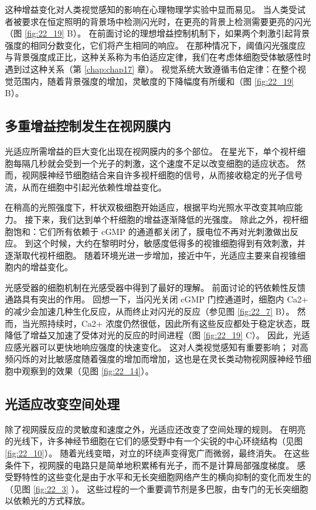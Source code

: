 这种增益变化对人类视觉感知的影响在心理物理学实验中显而易见。
当人类受试者被要求在恒定照明的背景场中检测闪光时，在更亮的背景上检测需要更亮的闪光（图 \ref{fig:22_19} B）。 
在前面讨论的理想增益控制机制下，如果两个刺激引起背景强度的相同分数变化，它们将产生相同的响应。 
在那种情况下，阈值闪光强度应与背景强度成正比，这种关系称为韦伯适应定律，我们在考虑体细胞受体敏感性时遇到过这种关系（第 \ref{chap:chap17} 章）。 
视觉系统大致遵循韦伯定律：在整个视觉范围内，随着背景强度的增加，灵敏度的下降幅度有所缓和（图 \ref{fig:22_19} B）。


\subsection{多重增益控制发生在视网膜内}
光适应所需增益的巨大变化出现在视网膜内的多个部位。 
在星光下，单个视杆细胞每隔几秒就会受到一个光子的刺激，这个速度不足以改变细胞的适应状态。 
然而，视网膜神经节细胞结合来自许多视杆细胞的信号，从而接收稳定的光子信号流，从而在细胞中引起光依赖性增益变化。


在稍高的光照强度下，杆状双极细胞开始适应，根据平均光照水平改变其响应能力。 
接下来，我们达到单个杆细胞的增益逐渐降低的光强度。 
除此之外，视杆细胞饱和：它们所有依赖于 cGMP 的通道都关闭了，膜电位不再对光刺激做出反应。 
到这个时候，大约在黎明时分，敏感度低得多的视锥细胞得到有效刺激，并逐渐取代视杆细胞。 
随着环境光进一步增加，接近中午，光适应主要来自视锥细胞内的增益变化。


光感受器的细胞机制在光感受器中得到了最好的理解。 
前面讨论的钙依赖性反馈通路具有突出的作用。 
回想一下，当闪光关闭 cGMP 门控通道时，细胞内 Ca2+ 的减少会加速几种生化反应，从而终止对闪光的反应（参见图 \ref{fig:22_7} B）。 
然而，当光照持续时，Ca2+ 浓度仍然很低，因此所有这些反应都处于稳定状态，既降低了增益又加速了受体对光的反应的时间进程（图 \ref{fig:22_19} C）。 
因此，光适应感光器可以更快地响应强度的快速变化。 
这对人类视觉感知有重要影响； 对高频闪烁的对比敏感度随着强度的增加而增加，这也是在灵长类动物视网膜神经节细胞中观察到的效果（见图 \ref{fig:22_14}）。


\subsection{光适应改变空间处理}

除了视网膜反应的灵敏度和速度之外，光适应还改变了空间处理的规则。 
在明亮的光线下，许多神经节细胞在它们的感受野中有一个尖锐的中心环绕结构（见图 \ref{fig:22_10}）。 
随着光线变暗，对立的环绕声变得宽广而微弱，最终消失。 
在这些条件下，视网膜的电路只是简单地积累稀有光子，而不是计算局部强度梯度。 
感受野特性的这些变化是由于水平和无长突细胞网络产生的横向抑制的变化而发生的（见图 \ref{fig:22_3} ）。 
这些过程的一个重要调节剂是多巴胺，由专门的无长突细胞以依赖光的方式释放。


